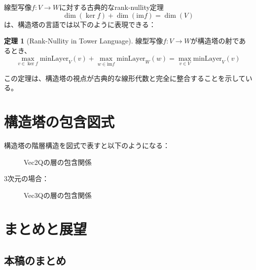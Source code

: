 \documentclass[11pt,a4paper]{ltjsarticle}
\theoremstyle{definition}
\newtheorem{theorem}{定理}[section]
\newcommand{\Q}{\mathbb{Q}}
\newcommand{\minLayer}{\mathrm{minLayer}}
\begin{document}
線型写像$f: V \to W$に対する古典的なrank-nullity定理
\[
\dim(\ker f) + \dim(\text{im} f) = \dim(V)
\]
は、構造塔の言語では以下のように表現できる：

\begin{theorem}[Rank-Nullity in Tower Language]
線型写像$f: V \to W$が構造塔の射であるとき、
\[
\max_{v \in \ker f} \minLayer_V(v) + \max_{w \in \text{im} f} \minLayer_W(w) = \max_{v \in V} \minLayer_V(v)
\]
\end{theorem}

この定理は、構造塔の視点が古典的な線形代数と完全に整合することを示している。

\section{構造塔の包含図式}

構造塔の階層構造を図式で表すと以下のようになる：

\begin{figure}[h]
\centering
{}
\caption{Vec2Qの層の包含関係}
\end{figure}

3次元の場合：

\begin{figure}[h]
\centering
{}
\caption{Vec3Qの層の包含関係}
\end{figure}

\section{まとめと展望}

\subsection{本稿のまとめ}
\end{document}
